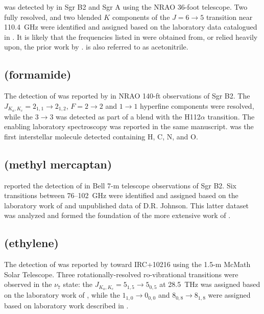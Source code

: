 \documentclass[twocolumn]{aastex631}
\begin{document}
	 was detected by \citet{Solomon:1971by} in Sgr B2 and Sgr A using the NRAO 36-foot telescope.  Two fully resolved, and two blended $K$ components of the $J = 6\rightarrow5$ transition near 110.4~GHz were identified and assigned based on the laboratory data catalogued in \citet{Cord:1968kw}.  It is likely that the frequencies listed in \citet{Cord:1968kw} were obtained from, or relied heavily upon, the prior work by \citet{Kessler:1950jk}.   is also referred to as acetonitrile.
	
	\subsection{ (formamide)}
	\label{NH2CHO}
	
	The detection of  was reported by \citet{Rubin:1971hg} in NRAO 140-ft observations of Sgr B2.  The $J_{K_a,K_c} = 2_{1,1}\rightarrow2_{1,2}$, $F = 2\rightarrow2$ and $1\rightarrow1$ hyperfine components were resolved, while the $3\rightarrow3$ was detected as part of a blend with the H112$\alpha$ transition.  The enabling laboratory spectroscopy was reported in the same manuscript.  was the first interstellar molecule detected containing H, C, N, and O.
	
	\subsection{ (methyl mercaptan)}
	\label{CH3SH}
	
	\citet{Linke:1979dc} reported the detection of  in Bell 7-m telescope observations of Sgr B2.  Six transitions between 76--102~GHz were identified and assigned based on the laboratory work of \citet{Kilb:1955ge} and unpublished data of D.R. Johnson.  This latter dataset was analyzed and formed the foundation of the more extensive work of \citet{Lees:1980nv}.
	
	\subsection{ (ethylene)}
	\label{C2H4}
	
	The detection of  was reported by \citet{Betz:1981if} toward IRC+10216 using the 1.5-m McMath Solar Telescope.  Three rotationally-resolved ro-vibrational transitions were observed in the $\nu_7$ state: the $J_{K_a,K_c} = 5_{1,5}\rightarrow5_{0,5}$ at 28.5~THz was assigned based on the laboratory work of \citet{Lambeau:1980iw}, while the $1_{1,0}\rightarrow0_{0,0}$ and $8_{0,8}\rightarrow8_{1,8}$ were assigned based on laboratory work described in \citet{Betz:1981if}.
	
\end{document}
